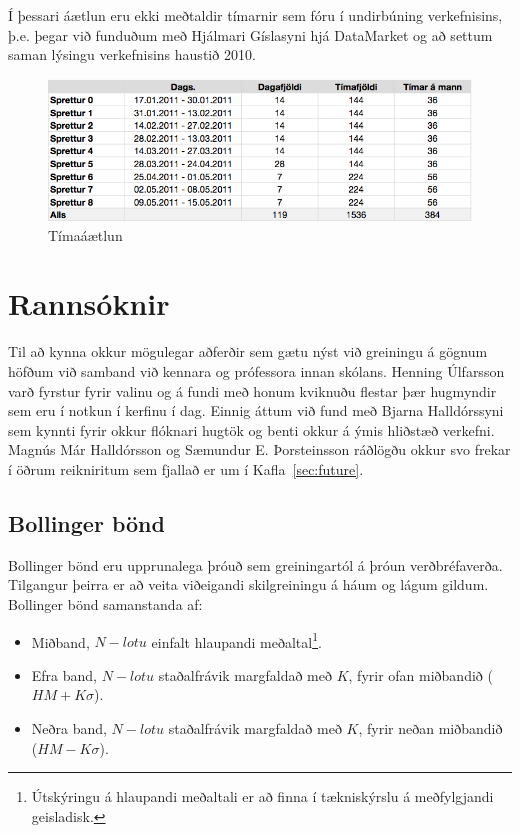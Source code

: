 \documentclass{article}
\begin{document}
Í þessari áætlun eru ekki meðtaldir tímarnir sem fóru í undirbúning verkefnisins, þ.e.
þegar við funduðum með Hjálmari Gíslasyni hjá DataMarket og að settum saman
lýsingu verkefnisins haustið 2010.

\begin{figure}[H]
  \centering
  \includegraphics[width=1\textwidth]{sprettir_timar.png} 
  \caption{Tímaáætlun} 
  \label{fig:timeplan}
\end{figure}


\newpage


\section{Rannsóknir}
\label{sec:research}
Til að kynna okkur mögulegar aðferðir sem gætu nýst við greiningu á gögnum
höfðum við samband við kennara og prófessora innan skólans. Henning Úlfarsson
varð fyrstur fyrir valinu og á fundi með honum kviknuðu flestar þær hugmyndir sem eru
í notkun í kerfinu í dag. Einnig áttum við fund með Bjarna Halldórssyni sem
kynnti fyrir okkur flóknari hugtök og benti okkur á ýmis hliðstæð verkefni.
Magnús Már Halldórsson og Sæmundur E. Þorsteinsson ráðlögðu okkur svo frekar í
öðrum reikniritum sem fjallað er um í Kafla~\ref{sec:future}.



\subsection{Bollinger bönd}
\label{sec:research_bollinger_bands}

Bollinger bönd eru upprunalega þróuð sem greiningartól
á þróun verðbréfaverða. 
Tilgangur þeirra er að veita viðeigandi skilgreiningu á háum og lágum gildum.
 \\

Bollinger bönd samanstanda af:



\begin{itemize}
  \item Miðband, $N-lotu$ einfalt hlaupandi meðaltal\footnote[1]{Útskýringu á
hlaupandi meðaltali er að finna í tækniskýrslu á meðfylgjandi geisladisk.}.
  \item Efra band, $N-lotu$ staðalfrávik margfaldað með $K$, fyrir ofan
miðbandið ($HM + K\sigma$).
  \item Neðra band, $N-lotu$ staðalfrávik margfaldað með $K$, fyrir neðan
miðbandið ($HM -K\sigma$).
\end{itemize}
\end{document}
